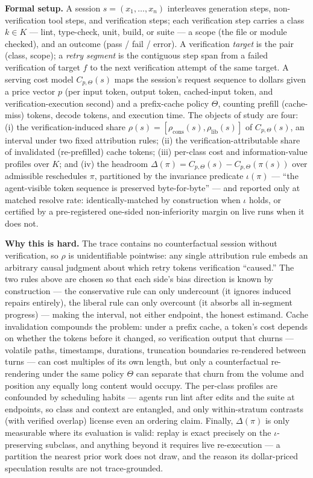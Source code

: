 \documentclass[11pt]{article}
\begin{document}
\textbf{Formal setup.} A session $s = (x_1, \ldots, x_n)$ interleaves generation steps, non-verification tool steps, and verification steps; each verification step carries a class $k \in K$ --- lint, type-check, unit, build, or suite --- a scope (the file or module checked), and an outcome (pass / fail / error). A verification \emph{target} is the pair (class, scope); a \emph{retry segment} is the contiguous step span from a failed verification of target $f$ to the next verification attempt of the same target. A serving cost model $C_{p,\Theta}(s)$ maps the session's request sequence to dollars given a price vector $p$ (per input token, output token, cached-input token, and verification-execution second) and a prefix-cache policy $\Theta$, counting prefill (cache-miss) tokens, decode tokens, and execution time. The objects of study are four: (i) the verification-induced share $\rho(s) = [\rho_{\mathrm{cons}}(s), \rho_{\mathrm{lib}}(s)]$ of $C_{p,\Theta}(s)$, an interval under two fixed attribution rules; (ii) the verification-attributable share of invalidated (re-prefilled) cache tokens; (iii) per-class cost and information-value profiles over $K$; and (iv) the headroom $\Delta(\pi) = C_{p,\Theta}(s) - C_{p,\Theta}(\pi(s))$ over admissible reschedules $\pi$, partitioned by the invariance predicate $\iota(\pi)$ --- ``the agent-visible token sequence is preserved byte-for-byte'' --- and reported only at matched resolve rate: identically-matched by construction when $\iota$ holds, or certified by a pre-registered one-sided non-inferiority margin on live runs when it does not.

\textbf{Why this is hard.} The trace contains no counterfactual session without verification, so $\rho$ is unidentifiable pointwise: any single attribution rule embeds an arbitrary causal judgment about which retry tokens verification ``caused.'' The two rules above are chosen so that each side's bias direction is known by construction --- the conservative rule can only undercount (it ignores induced repairs entirely), the liberal rule can only overcount (it absorbs all in-segment progress) --- making the interval, not either endpoint, the honest estimand. Cache invalidation compounds the problem: under a prefix cache, a token's cost depends on whether the tokens before it changed, so verification output that churns --- volatile paths, timestamps, durations, truncation boundaries re-rendered between turns --- can cost multiples of its own length, but only a counterfactual re-rendering under the same policy $\Theta$ can separate that churn from the volume and position any equally long content would occupy. The per-class profiles are confounded by scheduling habits --- agents run lint after edits and the suite at endpoints, so class and context are entangled, and only within-stratum contrasts (with verified overlap) license even an ordering claim. Finally, $\Delta(\pi)$ is only measurable where its evaluation is valid: replay is exact precisely on the $\iota$-preserving subclass, and anything beyond it requires live re-execution --- a partition the nearest prior work does not draw, and the reason its dollar-priced speculation results are not trace-grounded.
\end{document}

